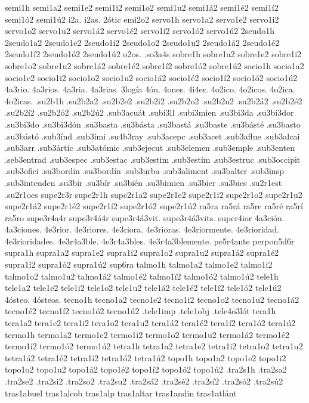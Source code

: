 {semi1h
semi1a2 semi1e2 semi1i2 semi1o2 semi1u2
semi1á2 semi1é2 semi1í2 semi1ó2 semi1ú2
i2a.
i2as.
2ótic
emi2o2
servo1h
servo1a2 servo1e2 servo1i2 servo1o2 servo1u2
servo1á2 servo1é2 servo1í2 servo1ó2 servo1ú2
2seudo1h
2seudo1a2 2seudo1e2 2seudo1i2 2seudo1o2 2seudo1u2
2seudo1á2 2seudo1é2 2seudo1í2 2seudo1ó2 2seudo1ú2
o2os.
.so3a4s
sobre1h
sobre1a2 sobre1e2 sobre1i2 sobre1o2 sobre1u2
sobre1á2 sobre1é2 sobre1í2 sobre1ó2 sobre1ú2
socio1h
socio1a2 socio1e2 socio1i2 socio1o2 socio1u2
socio1á2 socio1é2 socio1í2 socio1ó2 socio1ú2
4a3rio.
4a3rios.
4a3ria.
4a3rias.
3logía
4ón.
4ones.
4i4er.
4o2ico.
4o2icos.
4o2ica.
4o2icas.
.su2b1h
.su2b2a2 .su2b2e2 .su2b2i2 .su2b2o2 .su2b2u2
.su2b2á2 .su2b2é2 .su2b2í2 .su2b2ó2 .su2b2ú2
.sub3acuát
.subi3ll
.subi3mien
.su3bi3da
.su3bi3dor
.su3bi3do
.su3bi3dón
.su3basta
.su3básta
.su3bastá
.su3baste
.su3básté
.su3basto
.su3bástó
.sub3índ
.sub3ími
.su4b3ray
.sub3acepc
.sub3acet
.sub3aflue
.sub3alcai
.sub3arr
.sub3ártic
.sub3atómic
.sub3ejecut
.sub3elemen
.sub3emple
.sub3enten
.seb3entrad
.sub3espec
.sub3estac
.sub3estim
.sub3estím
.sub3estruc
.sub3occipit
.sub3ofici
.su3bordin
.su3bordín
.sub3urba
.sub3aliment
.su3balter
.sub3insp
.sub3intenden
.su3bir
.su3bír
.su3bién
.su3bimien
.su3bier
.su3bies
.su2r1est
.su2r1oes
supe2r3r
supe2r1h
supe2r1a2 supe2r1e2 supe2r1i2 supe2r1o2 supe2r1u2
supe2r1á2 supe2r1é2 supe2r1í2 supe2r1ó2 supe2r1ú2
ra5ra
ra5rá
ra5re
ra5ré
ra5rí
ra5ro
supe3r4a4r
supe3r4á4r
supe3r4á3vit.
supe3r4á3vits.
super4ior
4a3ción.
4a3ciones.
4e3rior.
4e3riores.
4e3riora.
4e3rioras.
4e3riormente.
4e3rioridad.
4e3rioridades.
4e3r4a3ble.
4e3r4a3bles.
4e3r4a3blemente.
pe5r4ante
perpon5d6r
supra1h
supra1a2 supra1e2 supra1i2 supra1o2 supra1u2
supra1á2 supra1é2 supra1í2 supra1ó2 supra1ú2
sup6ra
talmo1h
talmo1a2 talmo1e2 talmo1i2 talmo1o2 talmo1u2
talmo1á2 talmo1é2 talmo1í2 talmo1ó2 talmo1ú2
tele1h
tele1a2 tele1e2 tele1i2 tele1o2 tele1u2
tele1á2 tele1é2 tele1í2 tele1ó2 tele1ú2
4ósteo.
4ósteos.
tecno1h
tecno1a2 tecno1e2 tecno1i2 tecno1o2 tecno1u2
tecno1á2 tecno1é2 tecno1í2 tecno1ó2 tecno1ú2
.tele1imp
.tele1obj
.tele4o3lót
tera1h
tera1a2 tera1e2 tera1i2 tera1o2 tera1u2
tera1á2 tera1é2 tera1í2 tera1ó2 tera1ú2
termo1h
termo1a2 termo1e2 termo1i2 termo1o2 termo1u2
termo1á2 termo1é2 termo1í2 termo1ó2 termo1ú2
tetra1h
tetra1a2 tetra1e2 tetra1i2 tetra1o2 tetra1u2
tetra1á2 tetra1é2 tetra1í2 tetra1ó2 tetra1ú2
topo1h
topo1a2 topo1e2 topo1i2 topo1o2 topo1u2
topo1á2 topo1é2 topo1í2 topo1ó2 topo1ú2
.tra2s1h
.tra2sa2 .tra2se2 .tra2si2 .tra2so2 .tra2su2
.tra2sá2 .tra2sé2 .tra2sí2 .tra2só2 .tra2sú2
tras1abuel
tras1alcob
tras1alp
tras1altar
tras1andin
tras1atlánt
}
